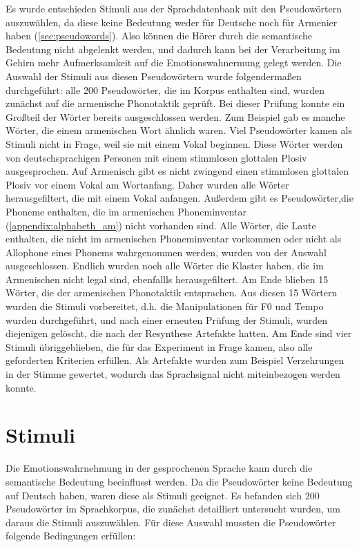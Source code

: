 \documentclass[11pt,a4paper,headsepline,twoside,toc=bibliography]{scrreprt}
\begin{document}
Es wurde entschieden Stimuli aus der Sprachdatenbank mit den Pseudowörtern auszuwählen, da diese keine Bedeutung weder für Deutsche noch für Armenier haben (\autoref{sec:pseudowords}). Also können die Hörer durch die semantische Bedeutung nicht abgelenkt werden, und dadurch kann bei der Verarbeitung im Gehirn mehr Aufmerksamkeit auf die Emotionswahnermung gelegt werden. Die Auswahl der Stimuli aus diesen Pseudowörtern wurde folgendermaßen durchgeführt: alle 200 Pseudowörter, die im Korpus enthalten sind, wurden zunächst auf die armenische Phonotaktik geprüft. Bei dieser Prüfung konnte ein Großteil der Wörter bereits ausgeschlossen werden. Zum Beispiel gab es manche Wörter, die einem armenischen Wort ähnlich waren.  Viel Pseudowörter kamen als Stimuli nicht in Frage, weil sie mit einem Vokal beginnen. Diese Wörter werden von deutschsprachigen Personen mit einem stimmlosen glottalen Plosiv ausgesprochen. Auf Armenisch gibt es nicht zwingend einen stimmlosen glottalen Plosiv vor einem Vokal am Wortanfang. Daher wurden alle Wörter herausgefiltert, die mit einem Vokal anfangen. Außerdem gibt es Pseudowörter,die Phoneme enthalten, die im armenischen Phoneminventar (\autoref{appendix:alphabeth_am}) nicht vorhanden sind. Alle Wörter, die Laute enthalten, die nicht im armenischen Phoneminventar vorkommen oder nicht als Allophone eines Phonems wahrgenommen werden, wurden von der Auswahl ausgeschlossen. Endlich wurden noch alle Wörter die Klaster haben, die im Armenischen nicht legal sind, ebenfallls herausgefiltert. Am Ende blieben 15 Wörter, die der armenischen Phonotaktik entsprachen. Aus diesen 15 Wörtern wurden die Stimuli vorbereitet, d.h. die Manipulationen für F0 und Tempo wurden durchgeführt, und nach einer erneuten Prüfung der Stimuli, wurden diejenigen gelöscht, die nach der Resynthese Artefakte hatten. Am Ende sind vier Stimuli übriggeblieben, die für das Experiment in Frage kamen, also alle geforderten Kriterien erfüllen. Als Artefakte wurden zum Beispiel Verzehrungen in der Stimme gewertet, wodurch das Sprachsignal nicht miteinbezogen werden konnte. 

\section{Stimuli}
\label{sec:stimuli}

Die Emotionswahrnehmung in der gesprochenen Sprache kann durch die semantische Bedeutung beeinflusst werden. Da die Pseudowörter keine Bedeutung auf Deutsch haben, waren diese als Stimuli geeignet. Es befanden sich 200 Pseudowörter im Sprachkorpus, die zunächst detailliert untersucht wurden, um daraus die Stimuli auszuwählen. Für diese Auswahl mussten die Pseudowörter folgende Bedingungen erfüllen:
\end{document}
